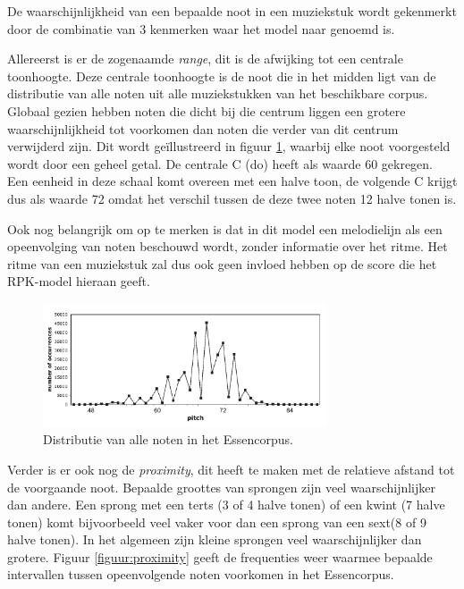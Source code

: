 De waarschijnlijkheid van een bepaalde noot in een muziekstuk wordt gekenmerkt door de combinatie van 3 kenmerken waar het model naar genoemd is. 

Allereerst is er de zogenaamde \textit{range}, dit is de afwijking tot een centrale toonhoogte. Deze centrale toonhoogte is de noot die in het midden ligt van de distributie van alle noten uit alle muziekstukken van het beschikbare corpus. Globaal gezien hebben noten die dicht bij die centrum liggen een grotere waarschijnlijkheid tot voorkomen dan noten die verder van dit centrum verwijderd zijn. Dit wordt ge\"illustreerd in figuur \ref{figuur:range}, waarbij elke noot voorgesteld wordt door een geheel getal. De centrale C (do) heeft als waarde 60 gekregen. Een eenheid in deze schaal komt overeen met een halve toon, de volgende C krijgt dus als waarde 72 omdat het verschil tussen de deze twee noten 12 halve tonen is. 

Ook nog belangrijk om op te merken is dat in dit model een melodielijn als een opeenvolging van noten beschouwd wordt, zonder informatie over het ritme. Het ritme van een muziekstuk zal dus ook geen invloed hebben op de score die het RPK-model hieraan geeft. 

\begin{figure}[!ht]
  \centering
  \includegraphics[width=0.75\textwidth]{2_Objectieve_Beoordeling/range}
  \caption{Distributie van alle noten in het Essencorpus.}
  \label{figuur:range}
\end{figure}

Verder is er ook nog de \textit{proximity}, dit heeft te maken met de relatieve afstand tot de voorgaande noot. Bepaalde groottes van sprongen zijn veel waarschijnlijker dan andere. Een sprong met een terts (3 of 4 halve tonen) of een kwint (7 halve tonen) komt bijvoorbeeld veel vaker voor dan een sprong van een sext(8 of 9 halve tonen). In het algemeen zijn kleine sprongen veel waarschijnlijker dan grotere. Figuur \ref{figuur:proximity} geeft de frequenties weer waarmee bepaalde intervallen tussen opeenvolgende noten voorkomen in het Essencorpus.

